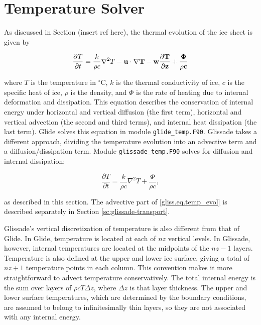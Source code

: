 
\section{Temperature Solver}
\label{sc:glissade-temperature}

As discussed in Section (insert ref here), the thermal evolution of the ice sheet is given by

\begin{equation}
  \label{gliss.eq.temp_evol}
  \frac{\partial T}{\partial t} = 
  \frac{k}{\rho c} {{\nabla }^{2}}T - \bf{u}\cdot \nabla T - w\frac{\partial T}{\partial z} + \frac{\Phi }{\rho c}
\end{equation}

\noindent
where $T$ is the temperature in $^\circ$C, $k$ is the thermal conductivity of ice, $c$ is the specific heat of ice, 
$\rho$ is the density, and $\Phi$ is the rate of heating due to internal deformation and dissipation.
This equation describes the conservation of internal energy under horizontal and vertical 
diffusion (the first term), horizontal and vertical advection (the second and third terms), and 
internal heat dissipation (the last term).
Glide solves this equation in module {\tt glide\_temp.F90}.
Glissade takes a different approach, dividing the temperature evolution into an advective term
and a diffusion/dissipation term.
Module {\tt glissade\_temp.F90} solves for diffusion and internal dissipation:

\begin{equation}
  \label{gliss.eq.vert_temp_evol}
  \frac{\partial T}{\partial t} = \frac{k}{\rho c}{{\nabla }^{2}}T + \frac{\Phi }{\rho c},
\end{equation}

\noindent
as described in this section.
The advective part of \eqref{gliss.eq.temp_evol} is described separately
in Section \ref{sc:glissade-transport}.

Glissade's vertical discretization of temperature is also different from that of Glide.
In Glide, temperature is located at each of $nz$ vertical levels.
In Glissade, however, internal temperatures are located at the midpoints of the $nz-1$ layers.
Temperature is also defined at the upper and lower ice surface, giving a total
of $nz+1$ temperature points in each column.  This convention makes it more straightforward
to advect temperature conservatively.  The total internal energy is the sum over layers of
$\rho c T \Delta z$, where $\Delta z$ is that layer thickness.  
The upper and lower surface temperatures, which are determined by the boundary conditions, 
are assumed to belong to infinitesimally thin layers, so they are not associated with
any internal energy.

